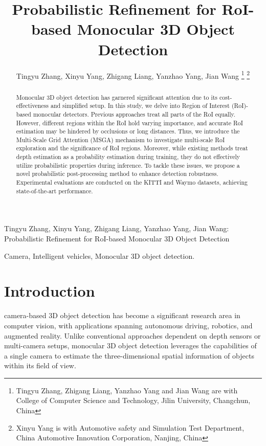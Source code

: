 \documentclass[journal]{IEEEtran}
\begin{document}
	\title{Probabilistic Refinement for RoI-based Monocular 3D Object Detection}
	\author{Tingyu Zhang, Xinyu Yang, Zhigang Liang, Yanzhao Yang, Jian Wang
		\thanks{Tingyu Zhang, Zhigang Liang, Yanzhao Yang and Jian Wang are with College of Computer Science and Technology, Jilin University, Changchun, China}
		\thanks{Xinyu Yang is with Automotive safety and Simulation Test Department, China Automotive Innovation Corporation, Nanjing, China}}
	
	{Tingyu Zhang, Xinyu Yang, Zhigang Liang, Yanzhao Yang, Jian Wang:
		Probabilistic Refinement for RoI-based Monocular 3D Object Detection}
	
	\maketitle
	
	\begin{abstract}
	Monocular 3D object detection has garnered significant attention due to its cost-effectiveness and simplified setup. In this study, we delve into Region of Interest (RoI)-based monocular detectors. Previous approaches treat all parts of the RoI equally. However, different regions within the RoI hold varying importance, and accurate RoI estimation may be hindered by occlusions or long distances. Thus, we introduce the Multi-Scale Grid Attention (MSGA) mechanism to investigate multi-scale RoI exploration and the significance of RoI regions. Moreover, while existing methods treat depth estimation as a probability estimation during training, they do not effectively utilize probabilistic properties during inference. To tackle these issues, we propose a novel probabilistic post-processing method to enhance detection robustness. Experimental evaluations are conducted on the KITTI and Waymo datasets, achieving state-of-the-art performance.
	\end{abstract}
	
	\begin{IEEEkeywords}
		Camera, Intelligent vehicles, Monocular 3D object detection.
	\end{IEEEkeywords}
	

	\section{Introduction}
	\noindent{} camera-based 3D object detection has become a significant research area in computer vision, with applications spanning autonomous driving, robotics, and augmented reality. Unlike conventional approaches dependent on depth sensors or multi-camera setups, monocular 3D object detection leverages the capabilities of a single camera to estimate the three-dimensional spatial information of objects within its field of view.
	
\end{document}

